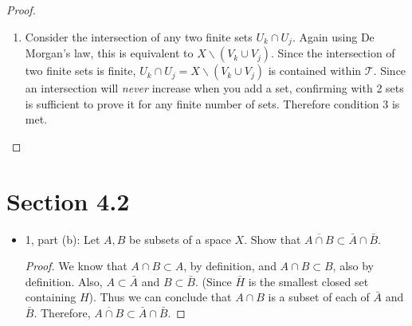 \documentclass[hidelinks,12pt]{article}
\theoremstyle{definition}
\newcommand{\T}{\mathcal T}
\begin{document}
\begin{itemize}
\begin{proof}
\begin{enumerate}
        \item Consider the intersection of any two finite sets $U_k\cap U_j$. Again using De Morgan's law, this is equivalent to $X\backslash(V_k\cup V_j)$. Since the intersection of two finite sets is finite, $U_k\cap U_j=X\backslash(V_k\cup V_j)$ is contained within $\T$. Since an intersection will \emph{never} increase when you add a set, confirming with 2 sets is sufficient to prove it for any finite number of sets. Therefore condition 3 is met.
    \end{enumerate}
    \end{proof}
\end{itemize}
\section{Section 4.2}
\begin{itemize}
    \item 1, part (b): Let $A,B$ be subsets of a space $X$. Show that $\overline{A\cap B}\subset\bar{A}\cap\bar{B}$.\begin{proof}We know that $A\cap B\subset A$, by definition, and $A\cap B\subset B$, also by definition. Also, $A\subset\bar{A}$ and $B\subset\bar{B}$. (Since $\bar{H}$ is the smallest closed set containing $H$). Thus we can conclude that $A\cap B$ is a subset of each of $\bar{A}$ and $\bar{B}$. Therefore, $\overline{A\cap B}\subset\bar{A}\cap\bar{B}$.
    \end{proof}
\end{itemize}
\end{document}
